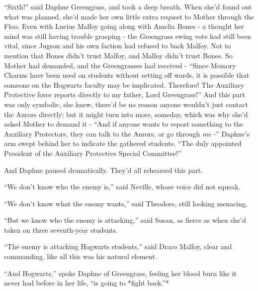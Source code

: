 ``Sixth!'' said Daphne Greengrass, and took a deep breath. When she'd
found out what was planned, she'd made her own little extra request to
Mother through the Floo. Even with Lucius Malfoy going along with Amelia
Bones - a thought her mind was still having trouble grasping - the
Greengrass swing vote had still been vital, since Jugson and his own
faction had refused to back Malfoy. Not to mention that Bones didn't
trust Malfoy, and Malfoy didn't trust Bones. So Mother had demanded, and
the Greengrasses had received - ``Since Memory Charms have been used on
students without setting off wards, it is possible that someone on the
Hogwarts faculty may be implicated. Therefore! The Auxiliary Protective
force reports directly to my father, Lord Greengrass!'' And this part
was only symbolic, she knew, there'd be no reason anyone wouldn't just
contact the Aurors directly; but it might turn into more, someday, which
was why she'd asked Mother to demand it - ``And if anyone wants to
report something to the Auxiliary Protectors, they can talk to the
Aurors, or go through \emph{me} -'' Daphne's arm swept behind her to
indicate the gathered students. ``The duly appointed President of the
Auxiliary Protective Special Committee!''

And Daphne paused dramatically. They'd all rehearsed this part.

``We don't know who the enemy is,'' said Neville, whose voice did not
squeak.

``We don't know what the enemy wants,'' said Theodore, still looking
menacing.

``But we know who the enemy is attacking,'' said Susan, as fierce as
when she'd taken on three seventh-year students.

``The enemy is attacking Hogwarts students,'' said Draco Malfoy, clear
and commanding, like all this was his natural element.

``And Hogwarts,'' spoke Daphne of Greengrass, feeling her blood burn
like it never had before in her life, ``is going to *fight back.''*
